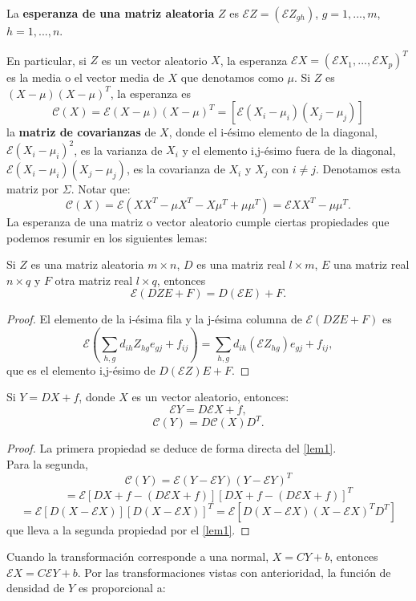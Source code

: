 \begin{definicion}
La \textbf{esperanza de una matriz aleatoria} $Z$ es $\mathcal{E}Z=(\mathcal{E}Z_{gh})$, $g=1,...,m$, $h=1,...,n$.
\end{definicion}
En particular, si $Z$ es un vector aleatorio $X$, la esperanza $\mathcal{E}X=(\mathcal{E}X_1,...,\mathcal{E}X_p)^T$ es la media o el vector media de $X$ que denotamos como $\mu$. Si $Z$ es $(X-\mu)(X-\mu)^T$, la esperanza es
\[ \mathcal{C}(X)=\mathcal{E}(X-\mu)(X-\mu)^T = [ \mathcal{E}(X_i-\mu_i)(X_j-\mu_j) ] \]
la \textbf{matriz de covarianzas} de $X$, donde el i-ésimo elemento de la diagonal, $\mathcal{E}(X_i-\mu_i)^2$, es la varianza de $X_i$ y el elemento i,j-ésimo fuera de la diagonal, $\mathcal{E}(X_i-\mu_i)(X_j-\mu_j)$, es la covarianza de $X_i$ y $X_j$ con $i \neq j$. Denotamos esta matriz por $\Sigma$. Notar que:
\[ \mathcal{C}(X)=\mathcal{E}(XX^T-\mu X^T - X\mu^T + \mu\mu^T) = \mathcal{E}XX^T - \mu\mu^T . \]
La esperanza de una matriz o vector aleatorio cumple ciertas propiedades que podemos resumir en los siguientes lemas:
\begin{lema}\label{lem1}
Si $Z$ es una matriz aleatoria $m \times n$, $D$ es una matriz real $l \times m$, $E$ una matriz real $n \times q$ y $F$ otra matriz real $l \times q$, entonces
\[ \mathcal{E}(DZE+F)=D(\mathcal{E}E)+F. \]
\end{lema}
\begin{proof}
El elemento de la i-ésima fila y la j-ésima columna de $\mathcal{E}(DZE+F)$ es 
\[ \mathcal{E} \left( \sum_{h,g} d_{ih}Z_{hg}e_{gj}+f_{ij} \right) = \sum_{h,g} d_{ih}(\mathcal{E}Z_{hg})e_{gj} + f_{ij}, \]
que es el elemento i,j-ésimo de $D(\mathcal{E}Z)E+F$.
\end{proof}
\begin{lema}\label{lem2}
Si $Y=DX+f$, donde $X$ es un vector aleatorio, entonces:
\[ \mathcal{E}Y=D \mathcal{E}X+f, \]
\[ \mathcal{C}(Y)=D\mathcal{C}(X)D^T. \]
\end{lema}
\begin{proof}
La primera propiedad se deduce de forma directa del \autoref{lem1}.\\
Para la segunda,
\[ \mathcal{C}(Y)=\mathcal{E}(Y-\mathcal{E}Y)(Y-\mathcal{E}Y)^T \]
\[ =\mathcal{E}[DX+f-(D\mathcal{E}X+f)][DX+f-(D\mathcal{E}X+f)]^T \]
\[ =\mathcal{E}[D(X-\mathcal{E}X)][D(X-\mathcal{E}X)]^T=\mathcal{E}[D(X-\mathcal{E}X)(X-\mathcal{E}X)^TD^T] \]
que lleva a la segunda propiedad por el \autoref{lem1}.
\end{proof}
Cuando la transformación corresponde a una normal, $X=CY+b$, entonces $\mathcal{E}X=C\mathcal{E}Y+b$. Por las transformaciones vistas con anterioridad, la función de densidad de $Y$ es proporcional a:

